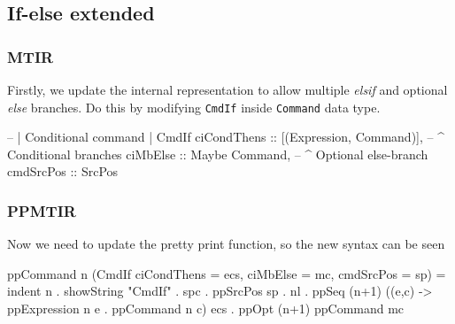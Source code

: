 \documentclass{article}
\begin{document}
\subsection{If-else extended}

\subsubsection{MTIR}
\begin{flushleft}
Firstly, we update the internal representation to allow multiple \textit{elsif} and optional \textit{else} branches. Do this by modifying \texttt{CmdIf} inside \texttt{Command} data type.
\end{flushleft}
\begin{code}
-- | Conditional command
| CmdIf {
      ciCondThens :: [(Expression,
                       Command)],   -- ^ Conditional branches
      ciMbElse    :: Maybe Command, -- ^ Optional else-branch
      cmdSrcPos   :: SrcPos
  }
\end{code}

\subsubsection{PPMTIR}
\begin{flushleft}
Now we need to update the pretty print function, so the new syntax can be seen
\end{flushleft}
\begin{code}
ppCommand n (CmdIf {ciCondThens = ecs, ciMbElse = mc, cmdSrcPos = sp}) =
    indent n . showString "CmdIf" . spc . ppSrcPos sp . nl
    . ppSeq (n+1) (\n (e,c) -> ppExpression n e . ppCommand n c) ecs
    . ppOpt (n+1) ppCommand mc
\end{code}
\end{document}
